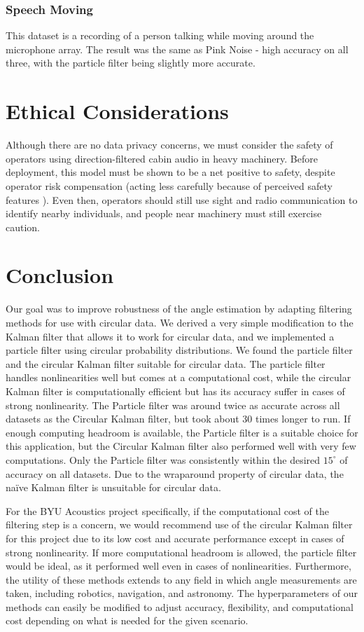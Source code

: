 \documentclass[11pt]{amsart}
\begin{document}
\subsubsection{Speech Moving}
This dataset is a recording of a person talking while moving around the microphone array. The result was the same as Pink Noise - high accuracy on all three, with the particle filter being slightly more accurate.

\section{Ethical Considerations}
Although there are no data privacy concerns, we must consider the safety of operators using direction-filtered cabin audio in heavy machinery. Before deployment, this model must be 
shown to be a net positive to safety, despite operator risk compensation (acting less carefully because of perceived safety features \cite{Risk}). Even then,
operators should still use sight and radio communication to identify nearby individuals, and people near machinery must still exercise caution. 

\section{Conclusion}
Our goal was to improve robustness of the angle estimation by adapting filtering methods for use with circular data. We derived a very simple modification to the Kalman filter that 
allows it to work for circular data, and we implemented a particle filter using circular probability distributions. We found the particle filter and the circular Kalman filter suitable 
for circular data. The particle filter handles nonlinearities well but comes at a computational cost, while the circular Kalman filter is computationally efficient but has its 
accuracy suffer in cases of strong nonlinearity. The Particle filter was around twice as accurate across all datasets as the Circular Kalman filter, but took about 30 times longer to run. If enough computing headroom is available, the Particle filter is a suitable choice for this application, but the Circular Kalman filter also performed well with very few computations. Only the Particle filter was consistently within the desired $15^{\circ}$ of accuracy on all datasets. Due to the wraparound property of circular data, the naïve Kalman filter is unsuitable for circular data.

For the BYU Acoustics project specifically, if the computational cost of the filtering step is a concern, we would recommend use of the circular Kalman filter for this project due to its low 
cost and accurate performance except in cases of strong nonlinearity. If more computational headroom is allowed, the particle filter would be ideal, as it performed well even in cases of 
nonlinearities. Furthermore, the utility of these methods extends to any field in which angle measurements are taken, including robotics, navigation, and astronomy. The hyperparameters of our 
methods can easily be modified to adjust accuracy, flexibility, and computational cost depending on what is needed for the given scenario. 
\end{document}
